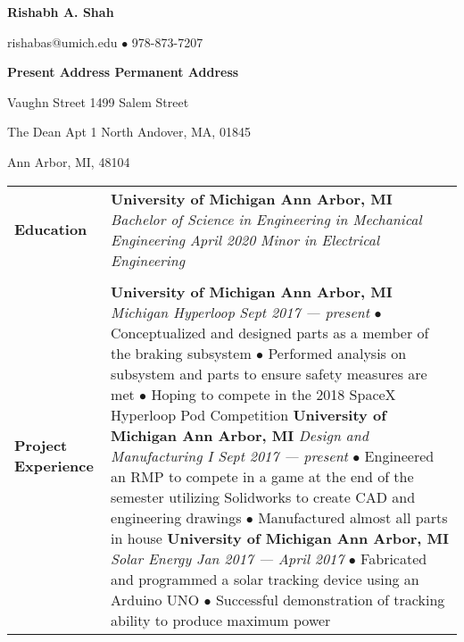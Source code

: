 \documentclass[12pt]{article}
\begin{document}

\begin{center}
	{\large\textbf{Rishabh A. Shah}}

	rishabas@umich.edu $\bullet$ 978-873-7207 \\
\end{center}

\noindent\textbf{Present Address \hfill Permanent Address}

 Vaughn Street \hfill 1499 Salem Street

\noindent The Dean Apt 1 \hfill North Andover, MA, 01845

\noindent Ann Arbor, MI, 48104 \\


\begin{table}[H]
	\centering
	\begin{tabularx}{\textwidth}{@{}X p{5.25in} @{}}
		\textbf{Education} & \textbf{University of Michigan \hfill Ann Arbor, MI} \newline \textit{Bachelor of Science in Engineering in Mechanical Engineering \hfill April 2020} \newline \textit{Minor in Electrical Engineering} 
		\\

		 & \\

		\textbf{Project Experience} & \textbf{University of Michigan \hfill Ann Arbor, MI} \newline \textit{Michigan Hyperloop} \hfill \textit{Sept 2017 --- present} \newline {\small$\bullet$ Conceptualized and designed parts as a member of the braking subsystem \newline $\bullet$ Performed analysis on subsystem and parts to ensure safety measures are met \newline $\bullet$ Hoping to compete in the 2018 SpaceX Hyperloop Pod Competition} \newline \textbf{University of Michigan \hfill Ann Arbor, MI} \newline \textit{Design and Manufacturing I \hfill Sept 2017 --- present } \newline {\small$\bullet$ Engineered an RMP to compete in a game at the end of the semester utilizing Solidworks to create CAD and engineering drawings \newline $\bullet$ Manufactured almost all parts in house} \newline \textbf{University of Michigan \hfill Ann Arbor, MI} \newline \textit{Solar Energy \hfill Jan 2017 --- April 2017} \newline {\small$\bullet$ Fabricated and programmed a solar tracking device using an Arduino UNO \newline $\bullet$ Successful demonstration of tracking ability to produce maximum power}\\
		 

\end{tabularx}
\end{table}
\end{document}

